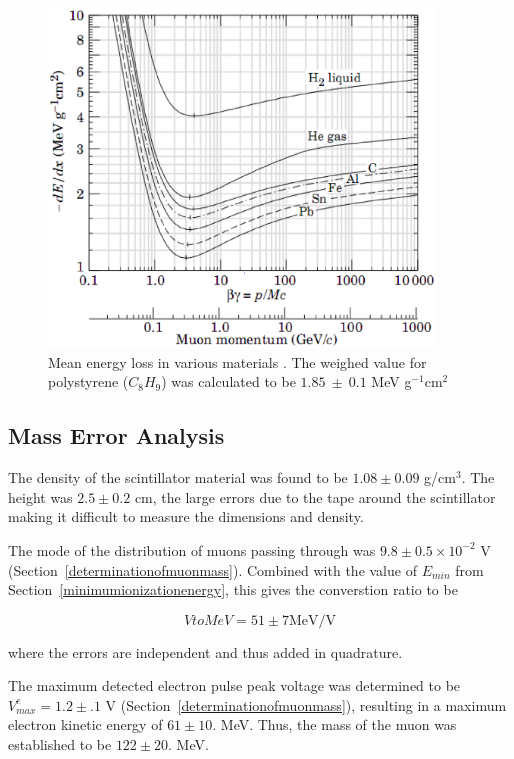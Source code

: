 \label{energy_loss}
\begin{figure}[h]
\begin{center}
\includegraphics[height = 90mm]{figures/energy_loss.eps}
\caption{\small{Mean energy loss in various materials \cite{yao}. The
weighed value for polystyrene ($C_8H_9$) was calculated to be
$1.85~\pm~0.1$ MeV g$^{-1}$cm$^{2}$}}
\label{figure:dEdx}
\end{center}
\end{figure}

\subsection{Mass Error Analysis}

The density of the scintillator material was found to be $1.08 \pm
0.09$ g/cm$^3$. The height was $2.5 \pm 0.2$ cm, the large errors due
to the tape around the scintillator making it difficult to measure the
dimensions and density.

The mode of the distribution of muons passing through was $9.8 \pm 0.5
\times 10^{-2}$ V (Section~\ref{determinationofmuonmass}). Combined
with the value of $E_{min}$ from Section~\ref{minimumionizationenergy},
this gives the converstion ratio to be

\begin{equation} VtoMeV = 51 \pm 7 \mathrm{ MeV/V} \end{equation}   

where the errors are independent and thus added in quadrature.

The maximum detected electron pulse peak voltage was determined to be
$V_{max}^e = 1.2 \pm .1$ V (Section~\ref{determinationofmuonmass}),
resulting in a maximum electron kinetic energy of $61\pm 10.$
MeV. Thus, the mass of the muon was established to be $122 \pm 20.$
MeV.
